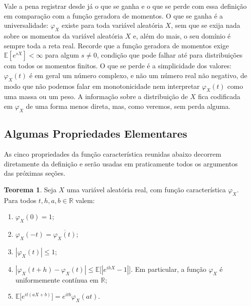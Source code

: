 \documentclass[12pt,portuguese]{article}
\theoremstyle{definition}
\newtheorem{theorem}{Teorema}
\theoremstyle{plainexercise}
\theoremstyle{starredexercise}
\theoremstyle{definition}
\begin{document}
\medskip

Vale a pena registrar desde já o que se ganha e o que se perde com essa
definição em comparação com a função geradora de momentos. 
O que se ganha é a universalidade: $\varphi_{X}$ existe para toda
variável aleatória $X$, sem que se exija nada sobre os momentos da variável aleatória $X$
e, além do mais, o seu domínio é sempre toda a reta real. Recorde que a função geradora de
momentos exige $\mathbb{E}[e^{sX}]<\infty$ para algum $s\neq 0$, condição que
pode falhar até para distribuições com todos os momentos finitos. O que se
perde é a simplicidade dos valores: $\varphi_{X}(t)$ é em geral um número
complexo, e não um número real não negativo, de modo que não podemos falar em
monotonicidade nem interpretar $\varphi_{X}(t)$ como uma massa ou um peso. A
informação sobre a distribuição de $X$ fica codificada em $\varphi_{X}$ de uma
forma menos direta, mas, como veremos, sem perda alguma.

\subsection{Algumas Propriedades Elementares}\label{subsec:fc-propriedades}

As cinco propriedades da função característica reunidas abaixo
decorrem diretamente da definição e serão usadas em praticamente todos os
argumentos das próximas seções. 

\begin{theorem}\label{thm:propriedades-fc}
Seja $X$ uma variável aleatória real, com função característica $\varphi_X$. Para
todos $t,h,a,b\in\mathbb{R}$ valem:
\begin{enumerate}[label=(\alph*)]
\item $\varphi_X(0)=1$;
\item $\varphi_X(-t)=\overline{\varphi_X(t)}$;
\item $|\varphi_X(t)|\leqslant1$;
\item $|\varphi_X(t+h)-\varphi_X(t)|\leqslant\mathbb{E}\bigl[|e^{ihX}-1|\bigr]$.
Em particular, a função $\varphi_X$ é uniformemente contínua em $\mathbb{R}$;
\item $\mathbb{E}\bigl[e^{it(aX+b)}\bigr]=e^{itb}\varphi_X(at)$.
\end{enumerate}
\end{theorem}
\end{document}
